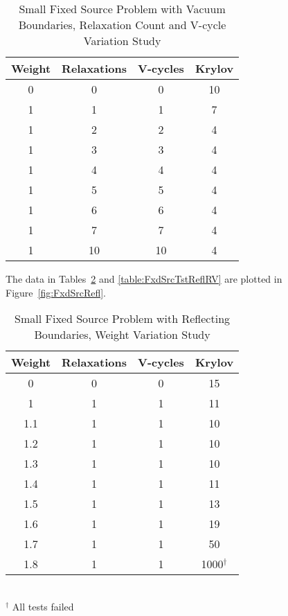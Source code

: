 \begin{table}[!h]
\caption{Small Fixed Source Problem with Vacuum Boundaries, Relaxation Count and V-cycle Variation Study}
\begin{center}
\begin{tabular}{|c| c| c| c|}
\hline
Weight & Relaxations & V-cycles & Krylov \\[0.5ex]
\hline
0  & 0 & 0 & 10 \\
1 & 1 & 1 & 7 \\
1 & 2 & 2 & 4 \\
1 & 3 & 3 & 4 \\
1 & 4 & 4 & 4 \\
1 & 5 & 5 & 4 \\
1 & 6 & 6 & 4 \\
1 & 7 & 7 & 4 \\
1 & 10 & 10 & 4 \\
\hline 
\end{tabular}
\end{center}
\label{table:FxdSrcTstVacRV}
\end{table}

The data in Tables~\ref{table:FxdSrcTstReflWeight} and \ref{table:FxdSrcTstReflRV} are plotted in Figure~\ref{fig:FxdSrcRefl}.
\begin{table}[!h]
\caption{Small Fixed Source Problem with Reflecting Boundaries, Weight Variation Study}
\begin{center}
\begin{tabular}{|c| c| c| c|}
\hline
Weight & Relaxations & V-cycles & Krylov \\[0.5ex]
\hline
0    & 0 & 0 & 15 \\
1    & 1 & 1 & 11 \\
1.1 & 1 & 1 & 10 \\
1.2 & 1 & 1 & 10 \\
1.3 & 1 & 1 & 10 \\
1.4 & 1 & 1 & 11 \\
1.5 & 1 & 1 & 13 \\
1.6 & 1 & 1 & 19 \\
1.7 & 1 & 1 & 50 \\
1.8 & 1 & 1 & 1000$^{\dagger}$ \\
\hline 
\end{tabular} \\
$^{\dagger}$ All tests failed
\end{center}
\label{table:FxdSrcTstReflWeight}
\end{table}

